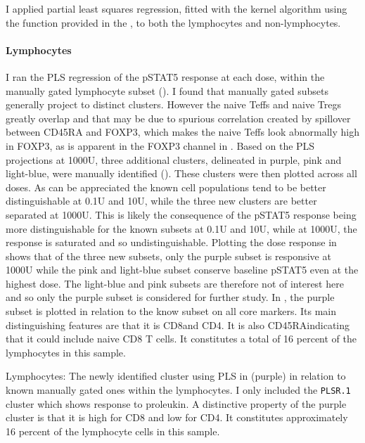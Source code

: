 I applied partial least squares regression, fitted with the kernel algorithm using the  function provided in the ,
to both the lymphocytes and non-lymphocytes.
%

\paragraph{Lymphocytes} 
I ran the PLS regression of the pSTAT5 response at each dose, within the manually gated lymphocyte subset ().
I found that manually gated subsets generally project to distinct clusters.
However the naive Teffs and naive Tregs greatly overlap and that may be due to spurious correlation created by
spillover between CD45RA and FOXP3, which makes the naive Teffs look abnormally high in FOXP3,
as is apparent in the FOXP3 channel in .
Based on the \gls{PLS} projections at 1000U, three additional clusters, delineated in purple, pink and light-blue, were manually identified
().  These clusters were then plotted across all doses.
As can be appreciated the known cell populations tend to be better distinguishable at 0.1U and 10U,
while the three new clusters are better separated at 1000U.  This is likely the consequence of the pSTAT5 response being more distinguishable
for the known subsets at 0.1U and 10U, while at 1000U, the response is saturated and so undistinguishable.
Plotting the dose response in  shows that of the three new subsets, only the purple subset is
responsive at 1000U while the pink and light-blue subset conserve baseline pSTAT5 even at the highest dose.
The light-blue and pink subsets are therefore not of interest here and so only the purple subset is considered for further study.
In , the purple subset is plotted in relation to the know subset on all core markers.
Its main distinguishing features are that it is CD8\positive and CD4\negative.
It is also CD45RA\positive indicating that it could include naive CD8 T cells.
It constitutes a total of 16 percent of the lymphocytes in this sample.

{ Lymphocytes: The newly identified cluster using \gls{PLS} in  (purple) in relation to known manually gated ones within the lymphocytes. }
{
    I only included the \texttt{PLSR.1} cluster which shows response to proleukin.
    A distinctive property of the purple cluster is that it is high for CD8 and low for CD4.
    It constitutes approximately 16 percent of the lymphocyte cells in this sample.
}

